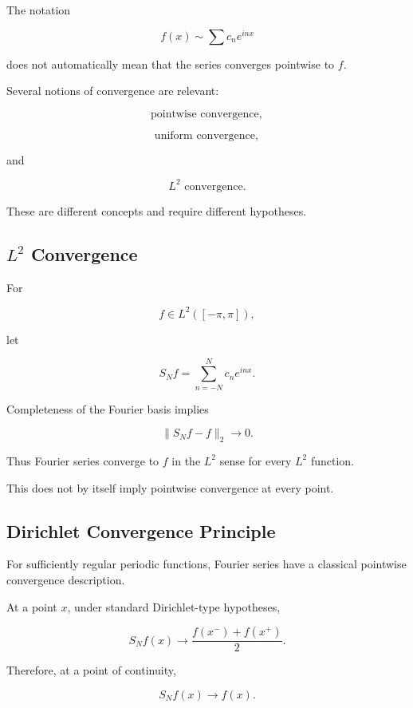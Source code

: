 The notation

\[
f(x)\sim\sum c_ne^{inx}
\]

does not automatically mean that the series converges pointwise to \(f\).

Several notions of convergence are relevant:

\[
\boxed{
\text{pointwise convergence},
}
\]

\[
\boxed{
\text{uniform convergence},
}
\]

and

\[
\boxed{
L^2\text{ convergence}.
}
\]

These are different concepts and require different hypotheses.

\subsection{\(L^2\) Convergence}
\label{subsec:l2-fourier-convergence}

For

\[
f\in L^2([-\pi,\pi]),
\]

let

\[
S_Nf
=
\sum_{n=-N}^{N}c_ne^{inx}.
\]

Completeness of the Fourier basis implies

\[
\boxed{
\|S_Nf-f\|_2\to0.
}
\]

Thus Fourier series converge to \(f\) in the \(L^2\) sense for every
\(L^2\) function.

This does not by itself imply pointwise convergence at every point.

\subsection{Dirichlet Convergence Principle}
\label{subsec:dirichlet-convergence-fourier}

For sufficiently regular periodic functions, Fourier series have a
classical pointwise convergence description.

At a point \(x\), under standard Dirichlet-type hypotheses,

\[
\boxed{
S_Nf(x)
\to
\frac{
f(x^-)+f(x^+)
}{2}.
}
\]

Therefore, at a point of continuity,

\[
\boxed{
S_Nf(x)\to f(x).
}
\]


